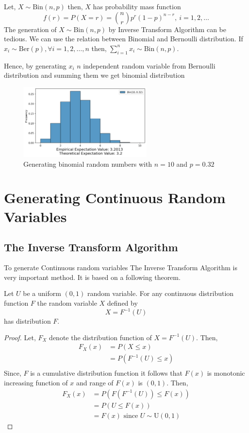 \begin{example}
    Let, $X\sim \text{Bin}(n,p)$ then,  $X$ has probability mass function
	\[
		f(r) = P(X=r) = {n\choose r}p^{r}(1-p)^{n-r},\  i = 1,2, \ldots
	\]
    The generation of $X\sim \text{Bin}(n,p)$ by Inverse Transform Algorithm can be tedious. We can use the relation between Binomial and Bernoulli distribution.
    If $x_i \sim \text{Ber}(p), \forall i = 1,2, \ldots, n$ then, $\sum_{i=1}^{n} x_i\sim \text{Bin}(n,p)$.

	Hence, by generating $x_i$ $n$ independent random variable from Bernoulli distribution and summing them we get binomial distribution
	\begin{figure}[H]
		\centering
		\includegraphics[width=0.6\textwidth]{images/bin_ITA.png}
		\caption{Generating  binomial random numbers with $n=10$ and  $p=0.32$}
	\end{figure}
\end{example}

\section{Generating Continuous Random Variables}

\subsection{The Inverse Transform Algorithm}
To generate Continuous random variables The Inverse Transform Algorithm is very important method. It is based on a following theorem.
\begin{theorem}
	\label{ITA theorem}
	Let $U$ be a uniform  $(0,1)$ random variable. For any continuous distribution function  $F$ the random variable  $X$ defined by
	\[
		X=F^{-1}(U)
	\]
	has distribution $F$.
\end{theorem}
\begin{proof}
	Let, $F_X$ denote the distribution function of  $X=F^{-1}(U)$. Then,
	\begin{align*}
		F_X(x) & = P(X\le x)         \\
		       & = P(F^{-1}(U)\le x) \\
	\end{align*}
	Since, $F$ is a cumulative distribution function it follows that $F(x)$ is monotonic increasing function of  $x$ and range of  $F(x)$ is  $(0,1)$.
	Then,
	\begin{align*}
		F_X(x) & = P\left(F\left(F^{-1}(U)\right)\le F(x)\right) \\
		       & = P(U\le F(x))                                  \\
               & = F(x) \text{ since $U\sim \text{U}(0,1)$ }
	\end{align*}
\end{proof}

